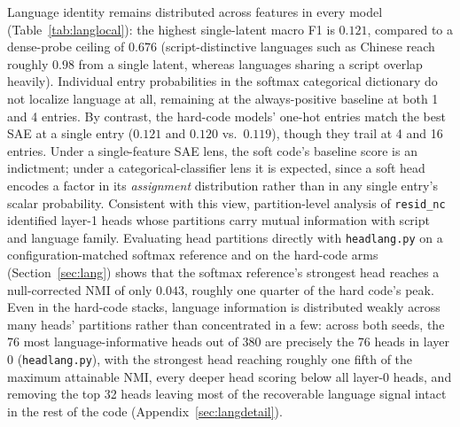 Language identity remains distributed across features in every model
(Table~\ref{tab:langlocal}): the highest single-latent macro F1 is
$0.121$, compared to a dense-probe ceiling of $0.676$ (script-distinctive
languages such as Chinese reach roughly $0.98$ from a single latent,
whereas languages sharing a script overlap heavily). Individual entry
probabilities in the softmax categorical dictionary do not localize
language at all, remaining at the always-positive baseline at both 1 and
4 entries. By contrast, the hard-code models' one-hot entries match the
best SAE at a single entry ($0.121$ and $0.120$ vs.\ $0.119$), though they
trail at 4 and 16 entries. Under a single-feature SAE lens, the soft
code's baseline score is an indictment; under a categorical-classifier lens it is
expected, since a soft head encodes a factor in its \emph{assignment}
distribution rather than in any single entry's scalar probability.
Consistent with this view, partition-level analysis of \texttt{resid\_nc}
identified layer-1 heads whose partitions carry mutual information with
script and language family. Evaluating head
partitions directly with \texttt{headlang.py} on a configuration-matched
softmax reference and on the hard-code arms (Section~\ref{sec:lang})
shows that the softmax reference's strongest head reaches a
null-corrected NMI of only $0.043$, roughly one quarter of the hard
code's peak. Even in the hard-code stacks, language information is
distributed weakly across many heads' partitions rather than concentrated
in a few: across both seeds, the 76 most language-informative heads out
of 380 are precisely the 76 heads in layer 0 (\texttt{headlang.py}), with
the strongest head reaching roughly one fifth of the maximum attainable
NMI, every deeper head scoring below all layer-0 heads, and removing the
top 32 heads leaving most of the recoverable language signal intact in
the rest of the code (Appendix~\ref{sec:langdetail}).

